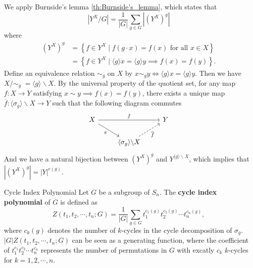 \begin{prf}
    We apply Burnside's lemma \ref{th:Burnside's_lemma}, which states that
    $$
        \left|Y^X / G\right|=\frac{1}{|G|} \sum_{g \in G}\left|\left(Y^X\right)^g\right|
    $$
    where
    \begin{align*}
        \left(Y^X\right)^g & =\left\{ f \in Y^X \mid f(g \cdot x)=f (x)\text{ for all }x \in X\right\}                  \\
                           & =\left\{ f \in Y^X \mid \langle g\rangle x = \langle g\rangle y\implies f(x)=f(y)\right\}.
    \end{align*}
    Define an equivalence relation $\sim_g$ on $X$ by $x \sim_g y\iff\langle g\rangle x = \langle g\rangle y$. Then we have $X/\sim_g\;=\langle g\rangle \backslash X$. By the universal property of the quotient set, for any map $f:X\to Y$ satisfying $x\sim y\implies f(x)=f(y)$, there exists a unique map $\overline{f}:\langle \sigma_g\rangle \backslash X\to Y$ such that the following diagram commutes
    \[
        \begin{tikzcd}[ampersand replacement=\&]
            X \arrow[rr, "f"] \arrow[rd,"\pi"'] \&  \& Y \\
            \& \langle \sigma_g\rangle \backslash X \arrow[ru, "\overline{f}"',dashed] \&
        \end{tikzcd}
    \]
    And we have a natural bijection between $\left(Y^X\right)^g$ and $Y^{\langle g\rangle \backslash X}$, which implies that $\left|\left(Y^X\right)^g\right|=|Y|^{c(g)}$.
\end{prf}

\begin{definition}{Cycle Index Polynomial}{}
    Let $G$ be a subgroup of $S_n$. The \textbf{cycle index polynomial} of $G$ is defined as
    $$
        Z(t_1,t_2,\cdots,t_n;G)=\frac{1}{|G|}\sum_{g\in G}t_1^{c_1(g)}t_2^{c_2(g)}\cdots t_n^{c_n(g)},
    $$
    where $c_k(g)$ denotes the number of $k$-cycles in the cycle decomposition of $\sigma_g$. $|G|Z(t_1,t_2,\cdots,t_n;G)$ can be seen as a generating function, where the coefficient of $t_1^{c_1}t_2^{c_2}\cdots t_n^{c_n}$ represents the number of permutations in $G$ with excatly $c_k$ $k$-cycles for $k=1,2,\cdots,n$.
\end{definition}

